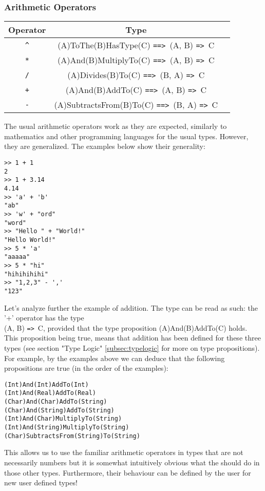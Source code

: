 \documentclass{article}
\def\ra{\texttt{=>}\ }
\def\Ra{\texttt{==>}\ }
\begin{document}
\subsubsection{Arithmetic Operators}
\begin{center}
\begin{tabular}{ |c|c|c| } 
\hline
Operator & Type \\ 
\hline
\hline
\texttt{\^} & (A)ToThe(B)HasType(C) \Ra (A, B) \ra C \\
\hline
\texttt{*} & (A)And(B)MultiplyTo(C) \Ra (A, B) \ra C \\
\hline
\texttt{/} & (A)Divides(B)To(C) \Ra (B, A) \ra C \\
\hline
\texttt{+} & (A)And(B)AddTo(C) \Ra (A, B) \ra C \\ 
\hline
\texttt{-} & (A)SubtractsFrom(B)To(C) \Ra (B, A) \ra C \\
\hline
\end{tabular}
\end{center}
The usual arithmetic operators work as they are expected, similarly to
mathematics and other programming languages for the usual types. However, they
are generalized. The examples below show their generality:
\begin{verbatim}
>> 1 + 1
2
>> 1 + 3.14
4.14
>> 'a' + 'b'
"ab"
>> 'w' + "ord"
"word"
>> "Hello " + "World!"
"Hello World!"
>> 5 * 'a'
"aaaaa"
>> 5 * "hi"
"hihihihihi"
>> "1,2,3" - ','
"123"
\end{verbatim}
Let's analyze further the example of addition. The type can be read as such:
the '+' operator has the type \\ (A, B) \ra C, provided that the type
proposition (A)And(B)AddTo(C) holds. This proposition being true, means that
addition has been defined for these three types (see section "Type Logic"
\ref{subsec:typelogic} for more on type propositions). For example, by the examples
above we can deduce that the following propositions are true (in the order of the 
examples):
\begin{verbatim}
(Int)And(Int)AddTo(Int)
(Int)And(Real)AddTo(Real)
(Char)And(Char)AddTo(String)
(Char)And(String)AddTo(String)
(Int)And(Char)MultiplyTo(String)
(Int)And(String)MultiplyTo(String)
(Char)SubtractsFrom(String)To(String)
\end{verbatim}
This allows us to use the familiar arithmetic operators in types that are not
necessarily numbers but it is somewhat intuitively obvious what the should do
in those other types. Furthermore, their behaviour can be defined by the user
for new user defined types!
\end{document}
